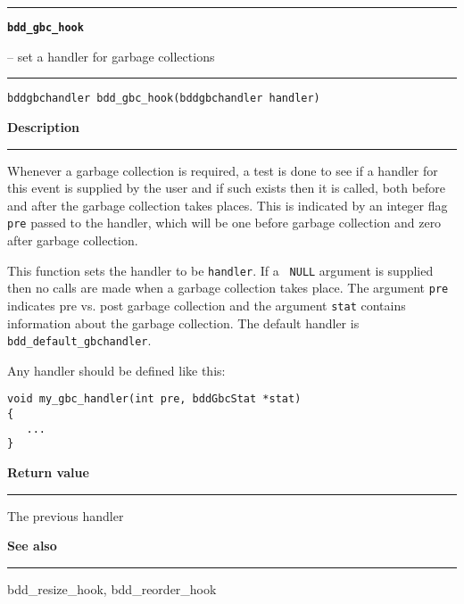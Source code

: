 \begin{minipage}{\textwidth}

\noindent\begin{minipage}{\textwidth}
\rule{\textwidth}{0.5mm}
{\tt\bf bdd\_gbc\_hook }
\--- set a handler for garbage collections  \hspace{\fill}
\\\rule[1.5ex]{\textwidth}{0.5mm}
\end{minipage}

\noindent\begin{verbatim}
bddgbchandler bdd_gbc_hook(bddgbchandler handler) 
\end{verbatim}

\vspace{\parsep}\noindent
{\bf Description}\\\rule[1.5ex]{\textwidth}{0.2mm}\vspace{-1.5ex}\setlength{\parindent}{1em}
Whenever a garbage collection is required, a test is done to
         see if a handler for this event is supplied by the user and if such
	 exists then it is called, both before and after the garbage collection
	 takes places. This is indicated by an integer flag {\tt pre} passed to
	 the handler, which will be one before garbage collection and zero
	 after garbage collection.

	 This function sets the handler to be {\tt handler}. If a {\tt
	 NULL} argument is supplied then no calls are made when a
	 garbage collection takes place. The argument {\tt pre}
	 indicates pre vs. post garbage collection and the argument
	 {\tt stat} contains information about the garbage
	 collection. The default handler is {\tt bdd\_default\_gbchandler}.

	 Any handler should be defined like this:
	 \begin{verbatim}
void my_gbc_handler(int pre, bddGbcStat *stat)
{
   ...
}
\end{verbatim} 

\setlength{\parindent}{0em}\vspace{\parsep}\vspace{\baselineskip}\noindent
{\bf Return value}\\\rule[1.5ex]{\textwidth}{0.2mm}\vspace{-1.5ex}
The previous handler 

\vspace{\parsep}\vspace{\baselineskip}\noindent
{\bf See also}\\\rule[1.5ex]{\textwidth}{0.2mm}\vspace{-1.5ex}
bdd\_resize\_hook, bdd\_reorder\_hook 
\end{minipage}
